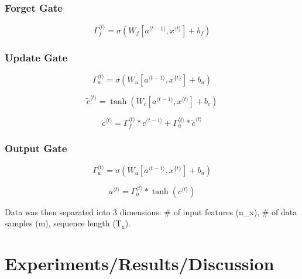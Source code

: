 \documentclass{article}
\begin{document}
\subsubsection{Forget Gate}

\begin{equation}
\Gamma_f^{\langle t \rangle} = \sigma(W_f[a^{\langle t-1 \rangle}, x^{\langle t \rangle}] + b_f)
\label{eq:forget_gate}
\end{equation}

\subsubsection{Update Gate}

\begin{equation}
\Gamma_u^{\langle t \rangle} = \sigma(W_u[a^{\langle t-1 \rangle}, x^{\{t\}}] + b_u)
\label{eq:update_gate1}
\end{equation}

\begin{equation}
\tilde{c}^{\langle t \rangle} = \tanh(W_c[a^{\langle t-1 \rangle}, x^{\langle t \rangle}] + b_c)
\label{eq:update_gate2}
\end{equation}

\begin{equation}
c^{\langle t \rangle} = \Gamma_f^{\langle t \rangle}* c^{\langle t-1 \rangle} + \Gamma_u^{\langle t \rangle} *\tilde{c}^{\langle t \rangle}
\label{eq:update_gate3}
\end{equation}

\subsubsection{Output Gate}

\begin{equation}
\Gamma_u^{\langle t \rangle} = \sigma(W_u[a^{\langle t-1 \rangle}, x^{\{t\}}] + b_u)
\label{eq:output_gate1}
\end{equation}

\begin{equation}
a^{\langle t \rangle} = \Gamma_o^{\langle t \rangle}* \tanh(c^{\langle t \rangle})
\label{eq:output_gate2}
\end{equation}

Data was then separated into 3 dimensions: \# of input features (n\_x), \# of data samples (m), sequence length (T$_{\text{x}}$).

\section{Experiments/Results/Discussion}
\end{document}
